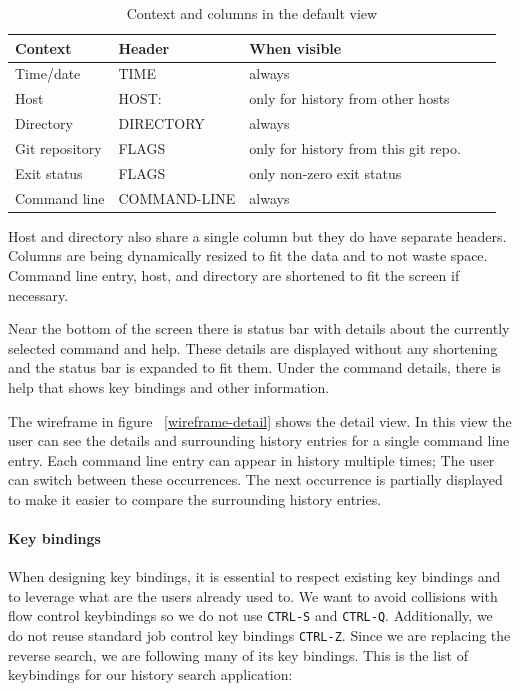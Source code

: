 \documentclass[thesis=M,english]{FITthesis}[2012/10/20]
\let\myRef\ref
\renewcommand\ref{\unskip~\myRef}
\begin{document}
\begin{table}[h]
\centering
\begin{tabular}{lllll}
\hline \hline
Context        & Header       & When visible                        \\\hline
Time/date      & TIME         & always                              \\ 
Host           & HOST:        & only for history from other hosts   \\ 
Directory      & DIRECTORY    & always                              \\ 
Git repository & FLAGS        & only for history from this git repo. \\ 
Exit status    & FLAGS        & only non-zero exit status           \\ 
Command line   & COMMAND-LINE & always                              \\\hline \hline
\end{tabular}
\caption{Context and columns in the default view}
\label{tab:design-columns}
\end{table}

Host and directory also share a single column but they do have separate headers. Columns are being dynamically resized to fit the data and to not waste space. Command line entry, host, and directory are shortened to fit the screen if necessary. 

Near the bottom of the screen there is status bar with details about the currently selected command and help. These details are displayed without any shortening and the status bar is expanded to fit them. Under the command details, there is help that shows key bindings and other information.


The wireframe in figure \ref{wireframe-detail} shows the detail view. In this view the user can see the details and surrounding history entries for a single command line entry. Each command line entry can appear in history multiple times; The user can switch between these occurrences. The next occurrence is partially displayed to make it easier to compare the surrounding history entries.



\paragraph{Key bindings}
When designing key bindings, it is essential to respect existing key bindings and to leverage what are the users already used to.
We want to avoid collisions with flow control keybindings so we do not use \verb|CTRL-S| and \verb|CTRL-Q|. Additionally, we do not reuse standard job control key bindings \verb|CTRL-Z|. 
Since we are replacing the reverse search, we are following many of its key bindings. This is the list of keybindings for our history search application:
\end{document}
